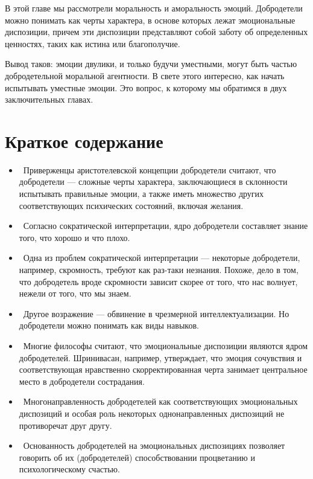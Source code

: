 \documentclass[11pt]{book}
\begin{document}
В этой главе мы рассмотрели моральность и аморальность эмоций. Добродетели можно понимать как черты характера, в основе которых лежат эмоциональные диспозиции, причем эти диспозиции представляют собой заботу об определенных ценностях, таких как истина или благополучие.

Вывод таков: эмоции двулики, и только будучи уместными, могут быть частью добродетельной моральной агентности. В свете этого интересно, как начать испытывать уместные эмоции. Это вопрос, к которому мы обратимся в двух заключительных главах.

\section{Краткое содержание}

\begin{itemize}
  \item\ Приверженцы аристотелевской концепции добродетели считают, что добродетели --- сложные черты характера, заключающиеся в склонности испытывать правильные эмоции, а также иметь множество других соответствующих психических состояний, включая желания.
  \item\ Согласно сократической интерпретации, ядро добродетели составляет знание того, что хорошо и что плохо.
  \item\ Одна из проблем сократической интерпретации --- некоторые добродетели, например, скромность, требуют как раз-таки незнания. Похоже, дело в том, что добродетель вроде скромности зависит скорее от того, что нас волнует, нежели от того, что мы знаем.
  \item\ Другое возражение --- обвинение в чрезмерной интеллектуализации. Но добродетели можно понимать как виды навыков.
  \item\ Многие философы считают, что эмоциональные диспозиции являются ядром добродетелей. Шринивасан, например, утверждает, что эмоция сочувствия и соответствующая нравственно скорректированная черта занимает центральное место в добродетели сострадания.
  \item\ Многонаправленность добродетелей как соответствующих эмоциональных диспозиций и особая роль некоторых однонаправленных диспозиций не противоречат друг другу.
  \item\ Основанность добродетелей на эмоциональных диспозициях позволяет говорить об их (добродетелей) способствовании процветанию и психологическому счастью.
\end{itemize}
\end{document}
